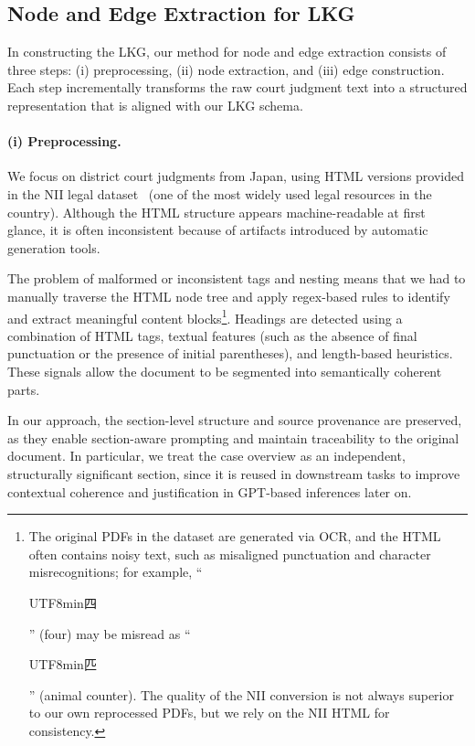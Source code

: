 \documentclass[11pt]{article}
\begin{document}
\subsection{Node and Edge Extraction for LKG}

In constructing the LKG, our method for node and edge extraction consists of three steps: (i) preprocessing, (ii) node extraction, and (iii) edge construction. Each step incrementally transforms the raw court judgment text into a structured representation that is aligned with our LKG schema.




\paragraph{\textbf{(i) Preprocessing.}}  

We focus on district court judgments from Japan, using HTML versions provided in the NII legal dataset~\cite{nii-hanrei} (one of the most widely used legal resources in the country). Although the HTML structure appears machine-readable at first glance, it is often inconsistent because of artifacts introduced by automatic generation tools.

The problem of malformed or inconsistent tags and nesting means that we had to manually traverse the HTML node tree and apply regex-based rules to identify and extract meaningful content blocks\footnote{The original PDFs in the dataset are generated via OCR, and the HTML often contains noisy text, such as misaligned punctuation and character misrecognitions; for example, “\begin{CJK}{UTF8}{min}四\end{CJK}” (four) may be misread as “\begin{CJK}{UTF8}{min}匹\end{CJK}” (animal counter). The quality of the NII conversion is not always superior to our own reprocessed PDFs, but we rely on the NII HTML for consistency.}. Headings are detected using a combination of HTML tags, textual features (such as the absence of final punctuation or the presence of initial parentheses), and length-based heuristics. These signals allow the document to be segmented into semantically coherent parts.



In our approach, the section-level structure and source provenance are preserved, as they enable section-aware prompting and maintain traceability to the original document. In particular, we treat the case overview as an independent, structurally significant section, since it is reused in downstream tasks to improve contextual coherence and justification in GPT-based inferences later on.
\end{document}
